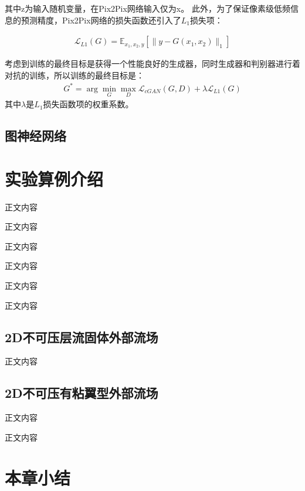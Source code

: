 \noindent 其中z为输入随机变量，在Pix2Pix网络输入仅为x。
此外，为了保证像素级低频信息的预测精度，Pix2Pix网络的损失函数还引入了$L_1$损失项：

\begin{equation}
\begin{aligned}
\mathcal{L}_{L 1}(G)=\mathbb{E}_{x_1, x_2, y}\left[\|y-G(x_1, x_2)\|_{1}\right]
\end{aligned}
\end{equation}

考虑到训练的最终目标是获得一个性能良好的生成器，同时生成器和判别器进行着对抗的训练，所以训练的最终目标是：
\begin{equation}
\begin{aligned}
G^{*}=\arg \min _{G} \max _{D} \mathcal{L}_{c G A N}(G, D)+\lambda \mathcal{L}_{L 1}(G)
\end{aligned}
\end{equation}
\noindent 其中$\lambda$是$L_1$损失函数项的权重系数。


\subsection{图神经网络}



\section{实验算例介绍}
正文内容

正文内容

正文内容

正文内容

正文内容

正文内容

\subsection{2D不可压层流固体外部流场}
正文内容

\subsection{2D不可压有粘翼型外部流场}
正文内容

正文内容




\section{本章小结}
